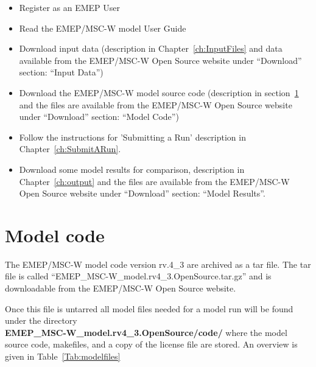 \begin{itemize}
\item Register as an EMEP User
\item Read the EMEP/MSC-W model User Guide
\item
Download input data (description in Chapter~\ref{ch:InputFiles} and
data available from the EMEP/MSC-W Open Source website under ``Download''
section: ``Input Data'')
\item
Download the EMEP/MSC-W model source code (description in 
section~\ref{sec:ModelCode} and the files are available from the EMEP/MSC-W 
Open Source website under ``Download'' section: ``Model Code'')
\item
Follow the instructions for 'Submitting a Run' description in
Chapter~\ref{ch:SubmitARun}.
\item
Download some model results for comparison, description in
Chapter~\ref{ch:output} and the files are available from the EMEP/MSC-W 
Open Source website under ``Download'' section: ``Model Results''. 


\end{itemize}

\section{Model code}
\label{sec:ModelCode}

The EMEP/MSC-W model code version rv.4\_3 are archived as a tar file. 
The tar file is called ``EMEP\_MSC-W\_model.rv4\_3.OpenSource.tar.gz'' and 
is downloadable from the EMEP/MSC-W Open Source website.

Once this file is untarred all model files needed for a model run will be 
found under the directory \\ {\bf EMEP\_MSC-W\_model.rv4\_3.OpenSource/code/} 
where the model source code, makefiles, and a copy of the license file are 
stored. An overview is given in Table~\ref{Tab:modelfiles}

